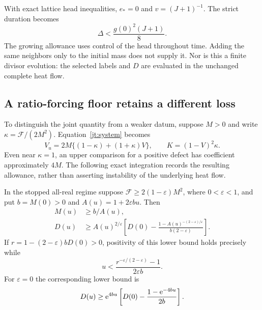 With exact lattice head inequalities, $e_*=0$ and
$v=(J+1)^{-1}$. The strict duration becomes
\begin{equation}
 \Delta<\frac{g(0)^2(J+1)}8.
 \label{jt:head-duration}
\end{equation}
The growing allowance uses control of the head throughout time. Adding
the same neighbors only to the initial mass does not supply it. Nor is
this a finite divisor evolution: the selected labels and $D$ are
evaluated in the unchanged complete heat flow.

\subsection{A ratio-forcing floor retains a different loss}

To distinguish the joint quantity from a weaker datum, suppose $M>0$
and write $\kappa=\mathcal F/(2M^2)$. Equation~\eqref{jt:system} becomes
\begin{equation}
 V_u=2M\{(1-\kappa)+(1+\kappa)V\},
 \qquad K=(1-V)^2\kappa.
 \label{jt:ratio-system}
\end{equation}
Even near $\kappa=1$, an upper comparison for a positive defect has
coefficient approximately $4M$. The following exact integration records
the resulting allowance, rather than asserting instability of the
underlying heat flow.

\begin{proposition}
\label{jt:ratio-comparison}
In the stopped all-real regime suppose
$\mathcal F\ge2(1-\varepsilon)M^2$, where $0<\varepsilon<1$,
and put $b=M(0)>0$ and $A(u)=1+2\varepsilon bu$. Then
\begin{equation}
 \begin{split}
 M(u)&\ge b/A(u),\\
 D(u)&\ge A(u)^{2/\varepsilon}
 \left[D(0)-
 \frac{1-A(u)^{-(2-\varepsilon)/\varepsilon}}
      {b(2-\varepsilon)}\right].
 \end{split}
 \label{jt:ratio-bound}
\end{equation}
If $r=1-(2-\varepsilon)bD(0)>0$, positivity of this lower bound
holds precisely while
\begin{equation}
 u<\frac{r^{-\varepsilon/(2-\varepsilon)}-1}
          {2\varepsilon b}.
 \label{jt:ratio-horizon}
\end{equation}
For $\varepsilon=0$ the corresponding lower bound is
\begin{equation}
 D(u)\ge\mathrm e^{4bu}
       \left[D(0)-\frac{1-\mathrm e^{-4bu}}{2b}\right].
 \label{jt:ratio-zero}
\end{equation}
\end{proposition}

